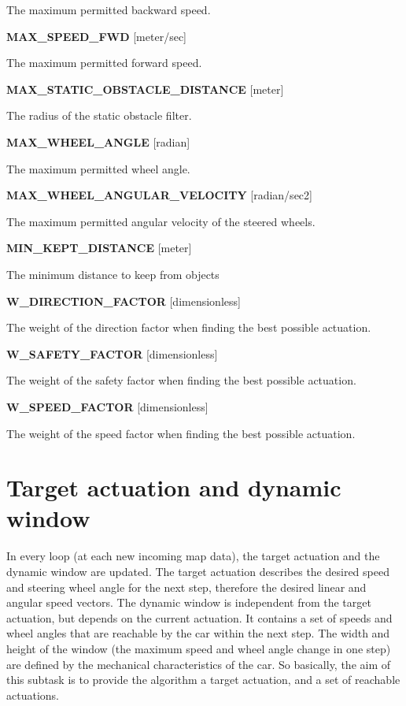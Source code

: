 \begin{minipage}{\textwidth}
The maximum permitted backward speed.

\textbf{MAX\_SPEED\_FWD} [meter/sec]

The maximum permitted forward speed.

\textbf{MAX\_STATIC\_OBSTACLE\_DISTANCE} [meter]

The radius of the static obstacle filter.

\textbf{MAX\_WHEEL\_ANGLE} [radian]

The maximum permitted wheel angle. 

\textbf{MAX\_WHEEL\_ANGULAR\_VELOCITY} [radian/sec2]

The maximum permitted angular velocity of the steered wheels.

\textbf{MIN\_KEPT\_DISTANCE} [meter]

The minimum distance to keep from objects

\textbf{W\_DIRECTION\_FACTOR} [dimensionless]

The weight of the direction factor when finding the best possible actuation.

\textbf{W\_SAFETY\_FACTOR} [dimensionless]

The weight of the safety factor when finding the best possible actuation.

\textbf{W\_SPEED\_FACTOR} [dimensionless]

The weight of the speed factor when finding the best possible actuation.
\end{minipage}

\section{Target actuation and dynamic window}
\label{chap:target_actuation_and_dynamic_window}
In every loop (at each new incoming map data), the target actuation and the dynamic window are updated. The target actuation describes the desired speed and steering wheel angle for the next step, therefore the desired linear and angular speed vectors. The dynamic window is independent from the target actuation, but depends on the current actuation. It contains a set of speeds and wheel angles that are reachable by the car within the next step. The width and height of the window (the maximum speed and wheel angle change in one step) are defined by the mechanical characteristics of the car. So basically, the aim of this subtask is to provide the algorithm a target actuation, and a set of reachable actuations.

